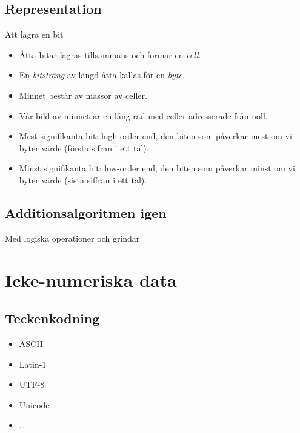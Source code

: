 \documentclass{beamer}
\theoremstyle{definition}
\theoremstyle{remark}
\begin{document}
\subsection{Representation}

\begin{frame}{\insertsubsectionhead}{Att lagra en bit}
\end{frame}

\begin{frame}{\insertsubsectionhead}
  \begin{itemize}
    \item Åtta bitar lagras tillsammans och formar en \emph{cell}.
    \item En \emph{bitsträng} av längd åtta kallas för en \emph{byte}.
    \item Minnet består av massor av celler.
    \item Vår bild av minnet är en lång rad med celler adresserade från noll.
    \item Mest signifikanta bit: high-order end, den biten som påverkar mest om 
      vi byter värde (första sifran i ett tal).
    \item Minst signifikanta bit: low-order end, den biten som påverkar minst 
      om vi byter värde (sista siffran i ett tal).
  \end{itemize}
\end{frame}

\subsection{Additionsalgoritmen igen}

\begin{frame}{\insertsubsectionhead}{Med logiska operationer och grindar}
\end{frame}


\section{Icke-numeriska data}

\subsection{Teckenkodning}

\begin{frame}{\insertsubsectionhead}
  \begin{itemize}
    \item ASCII
    \item Latin-1
    \item UTF-8
    \item Unicode
    \item \dots
  \end{itemize}
\end{frame}
\end{document}
